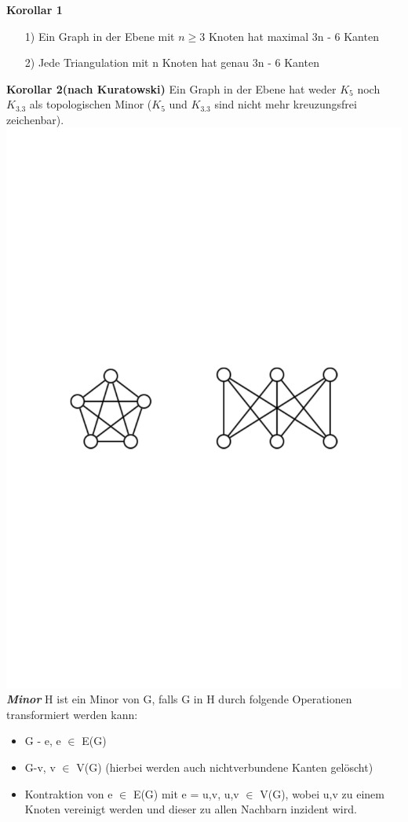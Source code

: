 \textbf{Korollar 1}
\begin{itemize}
	\item[1)] Ein Graph in der Ebene mit $n \ge 3$ Knoten hat maximal 3n - 6 Kanten
	\item[2)] Jede Triangulation mit n Knoten hat genau 3n - 6 Kanten 
\end{itemize}
\textbf{Korollar 2(nach Kuratowski)} \newline
Ein Graph in der Ebene hat weder $K_5$ noch $K_{3.3}$ als topologischen Minor ($K_5$ und $K_{3.3}$ sind nicht mehr kreuzungsfrei zeichenbar).\newline
\includegraphics[scale = 0.5]{lectures/161118/pix/K33+K5.pdf} \newline
\textbf{\textit{Minor}}\newline
H ist ein Minor von G, falls G in H durch folgende Operationen transformiert werden kann:
\begin{itemize}
	\item G - e, e $\in$ E(G)
	\item G-v, v $\in$ V(G) (hierbei werden auch nichtverbundene Kanten gelöscht)
	\item Kontraktion von e $\in$ E(G) mit e = {u,v}, u,v $\in$ V(G), wobei u,v zu einem Knoten vereinigt werden und dieser zu allen Nachbarn inzident wird.
\end{itemize}
